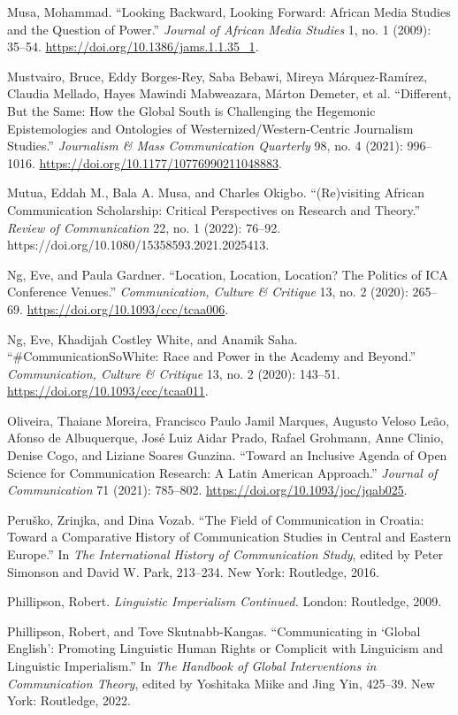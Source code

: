 \documentclass{tufte-handout}
\begin{document}
\begin{hangparas}{.25in}{1}
Musa, Mohammad. ``Looking Backward, Looking Forward: African Media
Studies and the Question of Power.'' \emph{Journal of African Media
Studies} 1, no. 1 (2009): 35--54.
\url{https://doi.org/10.1386/jams.1.1.35_1}.

Mustvairo, Bruce, Eddy Borges-Rey, Saba Bebawi, Mireya Márquez-Ramírez,
Claudia Mellado, Hayes Mawindi Mabweazara, Márton Demeter, et al.
``Different, But the Same: How the Global South is Challenging the
Hegemonic Epistemologies and Ontologies of Westernized/Western-Centric
Journalism Studies.'' \emph{Journalism \& Mass Communication Quarterly}
98, no. 4 (2021): 996--1016.
\url{https://doi.org/10.1177/10776990211048883}.

Mutua, Eddah M., Bala A. Musa, and Charles Okigbo. ``(Re)visiting
African Communication Scholarship: Critical Perspectives on Research and
Theory.'' \emph{Review of Communication} 22, no. 1 (2022): 76--92.
https://doi.org/10.1080/15358593.2021.2025413.

Ng, Eve, and Paula Gardner. ``Location, Location, Location? The Politics
of ICA Conference Venues.'' \emph{Communication, Culture \& Critique}
13, no. 2 (2020): 265--69. \url{https://doi.org/10.1093/ccc/tcaa006}.

Ng, Eve, Khadijah Costley White, and Anamik Saha.
``\#CommunicationSoWhite: Race and Power in the Academy and Beyond.''
\emph{Communication, Culture \& Critique} 13, no. 2 (2020): 143--51.
\url{https://doi.org/10.1093/ccc/tcaa011}.

Oliveira, Thaiane Moreira, Francisco Paulo Jamil Marques, Augusto Veloso
Leão, Afonso de Albuquerque, José Luiz Aidar Prado, Rafael Grohmann,
Anne Clinio, Denise Cogo, and Liziane Soares Guazina. ``Toward an
Inclusive Agenda of Open Science for Communication Research: A Latin
American Approach.'' \emph{Journal of Communication} 71 (2021):
785--802. \url{https://doi.org/10.1093/joc/jqab025}.

Peruško, Zrinjka, and Dina Vozab. ``The Field of Communication in
Croatia: Toward a Comparative History of Communication Studies in
Central and Eastern Europe.'' In \emph{The International History of
Communication Study}, edited by Peter Simonson and David W. Park,
213--234. New York: Routledge, 2016.

Phillipson, Robert. \emph{Linguistic Imperialism Continued.} London:
Routledge, 2009.

Phillipson, Robert, and Tove Skutnabb-Kangas. ``Communicating in `Global
English': Promoting Linguistic Human Rights or Complicit with Linguicism
and Linguistic Imperialism.'' In \emph{The Handbook of Global
Interventions in Communication Theory}, edited by Yoshitaka Miike and
Jing Yin, 425--39. New York: Routledge, 2022.


\end{hangparas}
\end{document}
